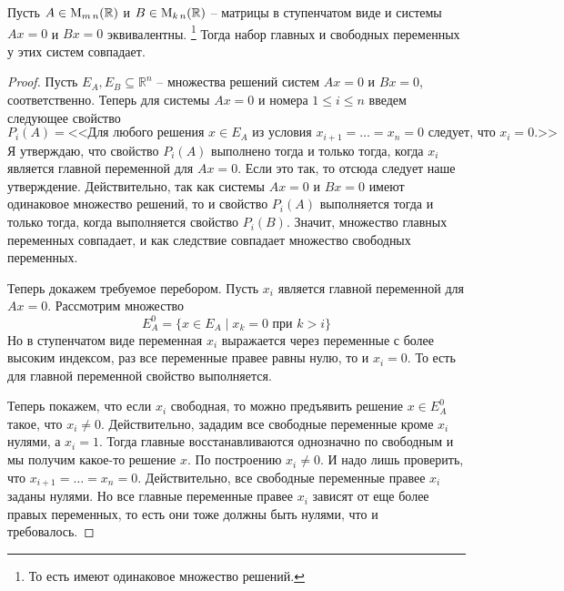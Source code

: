 \begin{claim}
\label{claim::SameLadderForm}
Пусть $A\in\operatorname{M}_{m\,n}(\mathbb R)$ и $B\in\operatorname{M}_{k\,n}(\mathbb R)$ -- матрицы в ступенчатом виде и системы $Ax = 0$ и $Bx = 0$ эквивалентны.%
\footnote{То есть имеют одинаковое множество решений.}
Тогда набор главных и свободных переменных у этих систем совпадает.
\end{claim}
\begin{proof}

Пусть $E_A, E_B\subseteq \mathbb R^n$ -- множества решений систем $Ax = 0$ и $Bx = 0$, соответственно.
Теперь для системы $Ax = 0$ и номера $1\leqslant i \leqslant n$ введем следующее свойство 
\[
P_i(A) = \text{<<Для любого решения $x\in E_A$ из условия $x_{i+1} = \ldots = x_n = 0$ следует, что $x_i = 0$.>>}
\]
Я утверждаю, что свойство $P_i(A)$ выполнено тогда и только тогда, когда $x_i$ является главной переменной для $Ax = 0$.
Если это так, то отсюда следует наше утверждение.
Действительно, так как системы $Ax = 0$ и $Bx = 0$ имеют одинаковое множество решений, то и свойство $P_i(A)$ выполняется тогда и только тогда, когда выполняется свойство $P_i(B)$.
Значит, множество главных переменных совпадает, и как следствие совпадает множество свободных переменных.

Теперь докажем требуемое перебором.
Пусть $x_i$ является главной переменной для $Ax = 0$.
Рассмотрим множество
\[
E_A^0 = \{x\in E_A\mid x_k = 0\text{ при }k>i\}
\]
Но в ступенчатом виде переменная $x_i$ выражается через переменные с более высоким индексом, раз все переменные правее равны нулю, то и $x_i = 0$.
То есть для главной переменной свойство выполняется.

Теперь покажем, что если $x_i$ свободная, то можно предъявить решение $x\in E_A^0$ такое, что $ x_i \neq 0$.
Действительно, зададим все свободные переменные кроме $x_i$ нулями, а $x_i = 1$.
Тогда главные восстанавливаются однозначно по свободным и мы получим какое-то решение $x$.
По построению $x_i\neq 0$.
И надо лишь проверить, что $x_{i+1} = \ldots = x_n = 0$.
Действительно, все свободные переменные правее $x_i$ заданы нулями.
Но все главные переменные правее $x_i$ зависят от еще более правых переменных, то есть они тоже должны быть нулями, что и требовалось.
\end{proof}


